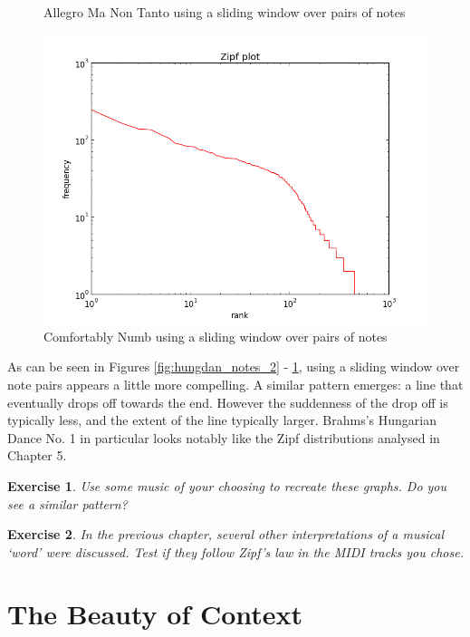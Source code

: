 \documentclass[10pt]{book}
\newtheorem{exercise}{Exercise}[chapter]
\begin{document}
\begin{figure}[!htb]
  \caption{Allegro Ma Non Tanto using a sliding window over pairs of notes}\label{fig:rach_notes_2}
\endminipage\hfill
{}%
  \includegraphics[width=\linewidth]{comf_notes_2}
  \caption{Comfortably Numb using a sliding window over pairs of notes}\label{fig:comf_notes_2}
\endminipage
\end{figure}

As can be seen in Figures \ref{fig:hungdan_notes_2} - \ref{fig:comf_notes_2}, using a sliding window over note pairs appears a little more compelling. A similar pattern emerges: a line that eventually drops off towards the end. However the suddenness of the drop off is typically less, and the extent of the line typically larger. Brahms's Hungarian Dance No. 1 in particular looks notably like the Zipf distributions analysed in Chapter 5.


\begin{exercise}
Use some music of your choosing to recreate these graphs. Do you see a similar pattern?
\end{exercise}

\begin{exercise}
In the previous chapter, several other interpretations of a musical `word' were discussed. Test if they follow Zipf's law in the MIDI tracks you chose.
\end{exercise}



\section{The Beauty of Context}
\end{document}
